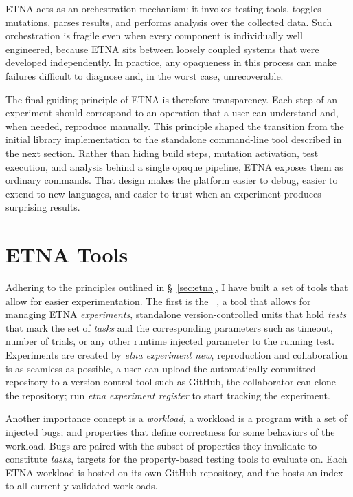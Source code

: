 ETNA acts as an orchestration mechanism: it invokes testing tools, toggles mutations,
parses results, and performs analysis over the collected data. Such orchestration is
fragile even when every component is individually well engineered, because ETNA sits
between loosely coupled systems that were developed independently. In practice, any
opaqueness in this process can make failures difficult to diagnose and, in the worst
case, unrecoverable.

The final guiding principle of ETNA is therefore transparency. Each step of an
experiment should correspond to an operation that a user can understand and, when
needed, reproduce manually. This principle shaped the transition from the initial
library implementation to the standalone command-line tool described in the next
section. Rather than hiding build steps, mutation activation, test execution, and
analysis behind a single opaque pipeline, ETNA exposes them as ordinary commands. That
design makes the platform easier to debug, easier to extend to new languages, and
easier to trust when an experiment produces surprising results.

\section{ETNA Tools}

Adhering to the principles outlined in \S~\ref{sec:etna}, I have built a set of tools
that allow for easier experimentation. The first is the
~\cite{etna-cli}, a tool that allows for managing ETNA
\emph{experiments}, standalone version-controlled units that hold \emph{tests} that
mark the set of \emph{tasks} and the corresponding parameters such as timeout, number
of trials, or any other runtime injected parameter to the running test. Experiments are
created by \emph{etna experiment new}, reproduction and collaboration is as seamless as
possible, a user can upload the automatically committed repository to a version control
tool such as GitHub, the collaborator can clone the repository; run \emph{etna
  experiment register} to start tracking the experiment.

Another importance concept is a \emph{workload}, a workload is a program with a set of
injected bugs; and properties that define correctness for some behaviors of the
workload. Bugs are paired with the subset of properties they invalidate to constitute
\emph{tasks}, targets for the property-based testing tools to evaluate on. Each ETNA
workload is hosted on its own GitHub repository, and the  hosts an
index~\cite{etna-index} to all currently validated workloads.

